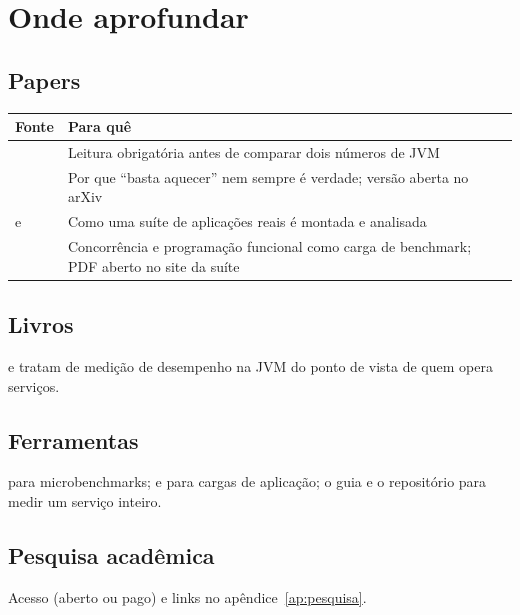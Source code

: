 \section{Onde aprofundar}

\subsection*{Papers}
\small
\begin{longtable}{@{}p{5.2cm} p{7cm}@{}}
\toprule
Fonte & Para quê \\
\midrule \endhead
\textcite{paper:statistically-rigorous-java-perf} & Leitura obrigatória
  antes de comparar dois números de JVM \\
\textcite{paper:vm-warmup-hot-cold} & Por que \enquote{basta aquecer} nem
  sempre é verdade; versão aberta no arXiv \\
\textcite{paper:dacapo} e \textcite{paper:dacapo-chopin} & Como uma suíte
  de aplicações reais é montada e analisada \\
\textcite{paper:renaissance} & Concorrência e programação funcional como
  carga de benchmark; PDF aberto no site da suíte \\
\bottomrule
\end{longtable}
\normalsize

\subsection*{Livros}
 e  tratam de
medição de desempenho na JVM do ponto de vista de quem opera serviços.

\subsection*{Ferramentas}
 para microbenchmarks;  e
 para cargas de aplicação; o guia
 e o repositório
 para medir um serviço inteiro.

\subsection*{Pesquisa acadêmica}
Acesso (aberto ou pago) e links no apêndice~\ref{ap:pesquisa}.
\begin{itemize}
\end{itemize}
